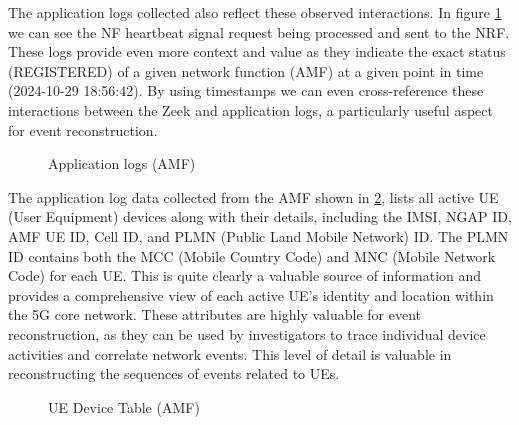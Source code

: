 \documentclass[final,1p,times,authoryear]{elsarticle}
\begin{document}
\vspace{1em}

The application logs collected also reflect these observed interactions. In figure \ref{fig:app-logs-1} we can see the NF heartbeat signal request being processed and sent to the NRF. These logs provide even more context and value as they indicate the exact status (REGISTERED) of a given network function (AMF) at a given point in time (2024-10-29 18:56:42). By using timestamps we can even cross-reference these interactions between the Zeek and application logs, a particularly useful aspect for event reconstruction.

\begin{figure}[H]
  \centering
  \caption{Application logs (AMF)}
  \label{fig:app-logs-1}
\end{figure}

The application log data collected from the AMF shown in \ref{fig:ue-device-table}, lists all active UE (User Equipment) devices along with their details, including the IMSI, NGAP ID, AMF UE ID, Cell ID, and PLMN (Public Land Mobile Network) ID. The PLMN ID contains both the MCC (Mobile Country Code) and MNC (Mobile Network Code) for each UE. This is quite clearly a valuable source of information and provides a comprehensive view of each active UE’s identity and location within the 5G core network. These attributes are highly valuable for event reconstruction, as they can be used by investigators to trace individual device activities and correlate network events. This level of detail is valuable in reconstructing the sequences of events related to UEs.

\begin{figure}[H]
  \centering
  \caption{UE Device Table (AMF)}
  \label{fig:ue-device-table}
\end{figure}
\end{document}

